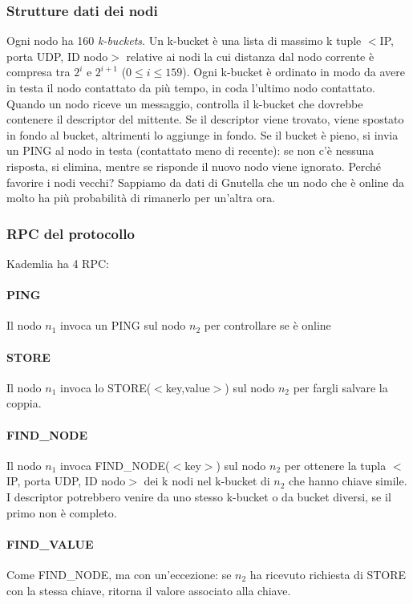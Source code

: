\documentclass[11pt]{article}
\begin{document}
\subsubsection{Strutture dati dei nodi} Ogni nodo ha 160 \textit{k-buckets}. Un k-bucket è una lista di massimo k tuple $<$IP, porta UDP, ID nodo$>$ relative ai nodi la cui distanza dal nodo corrente è compresa tra $2^i$ e $2^{i+1}$ ($0 \le i \le 159$). Ogni k-bucket è ordinato in modo da avere in testa il nodo contattato da più tempo, in coda l'ultimo nodo contattato. 
Quando un nodo riceve un messaggio, controlla il k-bucket che dovrebbe contenere il descriptor del mittente. Se il descriptor viene trovato, viene spostato in fondo al bucket, altrimenti lo aggiunge in fondo. Se il bucket è pieno, si invia un PING al nodo in testa (contattato meno di recente): se non c'è nessuna risposta, si elimina, mentre se risponde il nuovo nodo viene ignorato. Perché favorire i nodi vecchi? Sappiamo da dati di Gnutella che un nodo che è online da molto ha più probabilità di rimanerlo per un'altra ora.

\subsubsection{RPC del protocollo} Kademlia ha 4 RPC:
\paragraph{PING} Il nodo $n_1$ invoca un PING sul nodo $n_2$ per controllare se è online
\paragraph{STORE} Il nodo $n_1$ invoca lo STORE($<$key,value$>$) sul nodo $n_2$ per fargli salvare la coppia.
\paragraph{FIND\_NODE} Il nodo $n_1$ invoca FIND\_NODE($<$key$>$) sul nodo $n_2$ per ottenere la tupla $<$IP, porta UDP, ID nodo$>$ dei k nodi nel k-bucket di $n_2$ che hanno chiave simile. I descriptor potrebbero venire da uno stesso k-bucket o da bucket diversi, se il primo non è completo.

\paragraph{FIND\_VALUE} Come FIND\_NODE, ma con un'eccezione: se $n_2$ ha ricevuto richiesta di STORE con la stessa chiave, ritorna il valore associato alla chiave.
\end{document}
